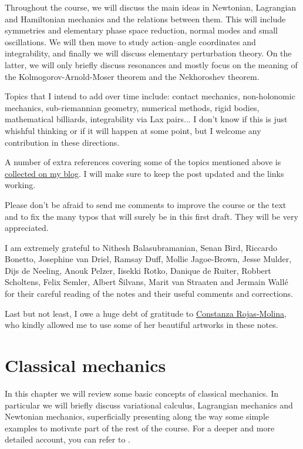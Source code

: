 \documentclass[english,fontsize=11pt,paper=b5]{scrbook}
\theoremstyle{definition}
\begin{document}
  Throughout the course, we will discuss the main ideas in Newtonian, Lagrangian and Hamiltonian mechanics and the relations between them.
  This will include symmetries and elementary phase space reduction, normal modes and small oscillations.
  We will then move to study action--angle coordinates and integrability, and finally we will discuss elementary perturbation theory.
  On the latter, we will only briefly discuss resonances and mostly focus on the meaning of the Kolmogorov-Arnold-Moser theorem and the Nekhoroshev theorem.

  Topics that I intend to add over time include: contact mechanics, non-holonomic mechanics, sub-riemannian geometry, numerical methods, rigid bodies, mathematical billiards, integrability via Lax pairs... I don't know if this is just whishful thinking or if it will happen at some point, but I welcome any contribution in these directions.

  A number of extra references covering some of the topics mentioned above is \href{https://www.mseri.me/links-from-hm/}{collected on my blog}. I will make sure to keep the post updated and the links working. \medskip

  Please don't be afraid to send me comments to improve the course or the text and to fix the many typos that will surely be in this first draft. They will be very appreciated.

  I am extremely grateful to Nithesh Balasubramanian, Senan Bird, Riccardo Bonetto, Jose\-phine van Driel, Ramsay Duff, Mollie Jagoe-Brown, Jesse Mulder, Dijs de Neeling, Anouk Pelzer, Iisekki Rotko, Danique de Ruiter, Robbert Scholtens, Felix Semler, Albert \v{S}ilvans, Marit van Straaten and Jermain Wall\'e for their careful reading of the notes and their useful comments and corrections.

  Last but not least, I owe a huge debt of gratitude to \href{https://crojasmolina.com}{Constanza Rojas-Molina}, who kindly allowed me to use some of her beautiful artworks in these notes.

  \chapter{Classical mechanics}

  In this chapter we will review some basic concepts of classical mechanics.
  In particular we will briefly discuss variational calculus, Lagrangian mechanics and Newtonian mechanics, superficially presenting along the way some simple examples to motivate part of the rest of the course.
  For a deeper and more detailed account, you can refer to \cite{book:arnold,book:knauf}.
\end{document}
